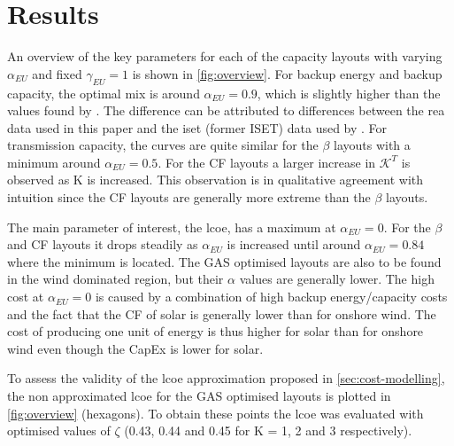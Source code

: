 \documentclass[a4paper, 5p, sort&compress]{elsarticle}%
\begin{document}
\section{Results}
\label{sec:results}

An overview of the key parameters for each of the capacity layouts
with varying $\alpha_{EU}$ and fixed $\gamma_{EU} = 1 $
is shown in \cref{fig:overview}. For
backup energy and backup capacity, the optimal mix is around
$\alpha_{EU} = 0.9$, which is slightly higher than the values found by
\cite{Heide2010,Heide2011}.
The difference can be attributed to differences between the \gls{rea} data used in this paper
and the \gls{iset} (former ISET) data \cite{iset} used by \cite{Heide2010,Heide2011}. For
transmission capacity, the curves are quite similar for the $\beta$
layouts with a minimum around $\alpha_{EU} = 0.5$.
For the CF layouts a larger increase in $\mathcal{K}^{T}$
is observed as K is increased. This observation is in qualitative agreement with intuition
since the CF layouts are generally more extreme than the $\beta$
layouts. %


The main parameter of interest, the \gls{lcoe}, has a maximum at
$\alpha_{EU} = 0$. For the $\beta$ and CF layouts it drops steadily as
$\alpha_{EU}$ is increased until around $\alpha_{EU} = 0.84$ where the minimum
is located. The GAS optimised layouts are also to be found in the wind
dominated region, but their $\alpha$ values are generally lower. The high
cost at $\alpha_{EU} = 0$ is caused by a combination of high backup
energy/capacity costs and the fact that the CF of solar is generally
lower than for onshore wind. The cost of producing one unit of energy
is thus higher for solar than for onshore wind even though the
\gls{CapEx} is lower for solar.

To assess the validity of the \gls{lcoe} approximation proposed in
\cref{sec:cost-modelling}, the non approximated \gls{lcoe} for the GAS
optimised layouts is plotted in \cref{fig:overview} (hexagons). To
obtain these points the \gls{lcoe} was evaluated with optimised values of
$\zeta$ (0.43, 0.44 and 0.45 for K = 1, 2 and 3 respectively).
\end{document}
